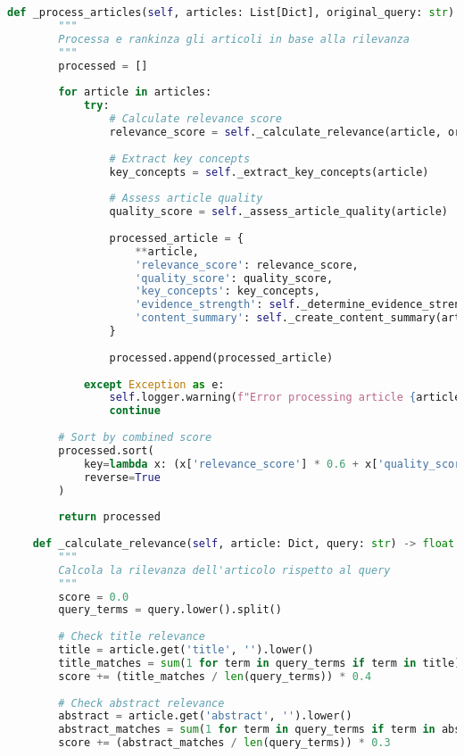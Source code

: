 \documentclass[12pt,a4paper]{report}
\begin{document}
\begin{lstlisting}[language=Python, caption=PubMed Service Implementation]
    def _process_articles(self, articles: List[Dict], original_query: str) -> List[Dict]:
        """
        Processa e rankinza gli articoli in base alla rilevanza
        """
        processed = []
        
        for article in articles:
            try:
                # Calculate relevance score
                relevance_score = self._calculate_relevance(article, original_query)
                
                # Extract key concepts
                key_concepts = self._extract_key_concepts(article)
                
                # Assess article quality
                quality_score = self._assess_article_quality(article)
                
                processed_article = {
                    **article,
                    'relevance_score': relevance_score,
                    'quality_score': quality_score,
                    'key_concepts': key_concepts,
                    'evidence_strength': self._determine_evidence_strength(article),
                    'content_summary': self._create_content_summary(article)
                }
                
                processed.append(processed_article)
                
            except Exception as e:
                self.logger.warning(f"Error processing article {article.get('pmid', 'unknown')}: {e}")
                continue
        
        # Sort by combined score
        processed.sort(
            key=lambda x: (x['relevance_score'] * 0.6 + x['quality_score'] * 0.4), 
            reverse=True
        )
        
        return processed
    
    def _calculate_relevance(self, article: Dict, query: str) -> float:
        """
        Calcola la rilevanza dell'articolo rispetto al query
        """
        score = 0.0
        query_terms = query.lower().split()
        
        # Check title relevance
        title = article.get('title', '').lower()
        title_matches = sum(1 for term in query_terms if term in title)
        score += (title_matches / len(query_terms)) * 0.4
        
        # Check abstract relevance  
        abstract = article.get('abstract', '').lower()
        abstract_matches = sum(1 for term in query_terms if term in abstract)
        score += (abstract_matches / len(query_terms)) * 0.3
        

\end{lstlisting}
\end{document}
